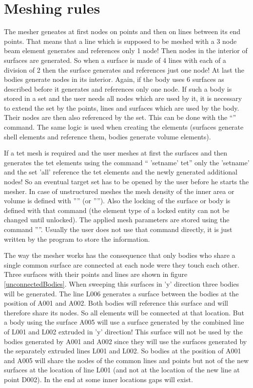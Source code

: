 \documentclass{article}
\begin{document}
\section{\label{Meshing rules}Meshing rules}
The mesher geneates at first nodes on points and then on lines between its end points. That means that a line which is supposed to be meshed with a 3 node beam element generates and references only 1 node! Then nodes in the interior of surfaces are generated. So when a surface is made of 4 lines with each of a division of 2 then the surface generates and references just one node! At last the bodies generate nodes in its interior. Again, if the body uses 6 surfaces as described before it generates and references only one node. If such a body is stored in a set and the user needs all nodes which are used by it, it is necessary to extend the set by the points, lines and surfaces which are used by the body. Their nodes are then also referenced by the set. This can be done with the ``'' command. The same logic is used when creating the elements (surfaces generate shell elements and reference them, bodies generate volume elements).

If a tet mesh is required and the user meshes at first the surfaces and then generates the tet elements using the command `` 'setname' tet'' only the 'setname' and the set 'all' reference the tet elements and the newly generated additional nodes! So an eventual target set has to be opened by the user before he starts the mesher. In case of unstructured meshes the mesh density of the inner area or volume is defined with '''' (or ''''). Also the locking of the surface or body is defined with that command (the element type of a locked entity can not be changed until unlocked). The applied mesh parameters are stored using the command ''''. Usually the user does not use that command directly, it is just written by the program to store the information.

The way the mesher works has the consequence that only bodies who share a single common surface are connected at each node were they touch each other. Three surfaces with their points and lines are shown in figure \ref{unconnectedBodies}. When sweeping this surfaces in 'y' direction three bodies will be generated. The line L006 generates a surface between the bodies at the position of A001 and A002. Both bodies will reference this surface and will therefore share its nodes. So all elements will be connected at that location. But a body using the surface A005 will use a surface generated by the combined line of L001 and L002 extruded in 'y' direction! This surface will not be used by the bodies generated by A001 and A002 since they will use the surfaces generated by the separately extruded lines L001 and L002. So bodies at the position of A001 and A005 will share the nodes of the common lines and points but not of the new surfaces at the location of line L001 (and not at the location of the new line at point D002). In the end at some inner locations gaps will exist.
  
\end{document}
